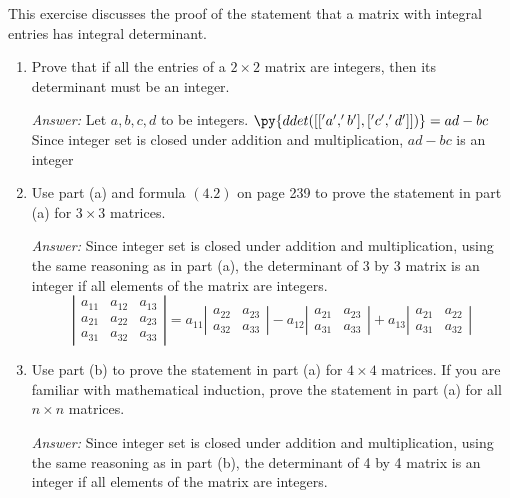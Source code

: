 \documentclass[letterpaper]{article}
\newcommand{\ans}{\textit{Answer: }}
\newenvironment{question}[2][Question]{\begin{trivlist}
\item[\hskip \labelsep {\bfseries #1}\hskip \labelsep {\bfseries #2.}]}{\end{trivlist}}
\begin{document}
\begin{question}{4.6}
  This exercise discusses the proof of the statement that a matrix with integral
  entries has integral determinant.

  \begin{enumerate}[label=\textbf{(\alph*)}]
    \item Prove that if all the entries of a $2 \times 2$ matrix are integers, then its determinant must be an integer.
    
    \ans Let $a, b, c, d$ to be integers.
    $\py{ddet([['a', 'b'], ['c', 'd']])} = ad - bc$
    Since integer set is closed under addition and multiplication, $ad - bc$ is an integer

    \item Use part (a) and formula $(4.2)$ on page 239 to prove the statement in part
    (a) for $3 \times 3$ matrices.
    
    \ans Since integer set is closed under addition and multiplication, using the same reasoning as in part (a), the determinant of 3 by 3 matrix is an integer if all elements of the matrix are integers.
    $$
    \left| \begin{array}{lll}{a_{11}} & {a_{12}} & {a_{13}} \\ {a_{21}} & {a_{22}} & {a_{23}} \\ {a_{31}} & {a_{32}} & {a_{33}}\end{array}\right|=a_{11} \left| \begin{array}{cc}{a_{22}} & {a_{23}} \\ {a_{32}} & {a_{33}}\end{array}\right|-a_{12} \left| \begin{array}{cc}{a_{21}} & {a_{23}} \\ {a_{31}} & {a_{33}}\end{array}\right|+a_{13} \left| \begin{array}{cc}{a_{21}} & {a_{22}} \\ {a_{31}} & {a_{32}}\end{array}\right|
    $$

    \item Use part (b) to prove the statement in part (a) for $4 \times 4$ matrices. If you
    are familiar with mathematical induction, prove the statement in part (a)
    for all $n \times n$ matrices.
    
    \ans Since integer set is closed under addition and multiplication, using the same reasoning as in part (b), the determinant of 4 by 4 matrix is an integer if all elements of the matrix are integers.
  \end{enumerate}
\end{question}
\end{document}
